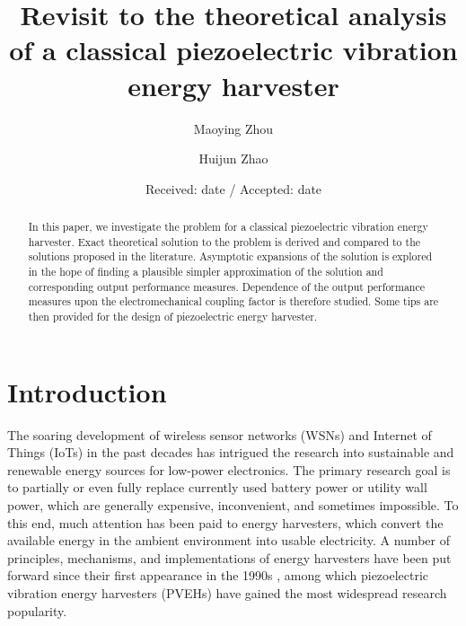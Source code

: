 \documentclass{svjour3}                     %
\begin{document}
\title{Revisit to the theoretical analysis of a classical piezoelectric vibration energy harvester }

\author{Maoying Zhou         \and
        Huijun Zhao %
}



\date{Received: date / Accepted: date}


\maketitle

\begin{abstract}
In this paper, we investigate the problem for a classical piezoelectric vibration energy harvester. Exact theoretical solution to the problem is derived and compared to the solutions proposed in the literature. Asymptotic expansions of the solution is explored in the hope of finding a plausible simpler approximation of the solution and corresponding output performance measures. Dependence of the output performance measures upon the electromechanical coupling factor is therefore studied. Some tips are then provided for the design of piezoelectric energy harvester.

\end{abstract}

\section{Introduction}

The soaring development of wireless sensor networks (WSNs) and Internet of Things (IoTs) in the past decades has intrigued the research into sustainable and renewable energy sources for low-power electronics. The primary research goal is to partially or even fully replace currently used battery power or utility wall power, which are generally expensive, inconvenient, and sometimes impossible. To this end, much attention has been paid to energy harvesters, which convert the available energy in the ambient environment into usable electricity. A number of principles, mechanisms, and implementations of energy harvesters have been put forward since their first appearance in the 1990s \cite{beeby2006energy,anton2007review,zhou2018review,safaei2019review}, among which piezoelectric vibration energy harvesters (PVEHs) have gained the most widespread research popularity. 
\end{document}
